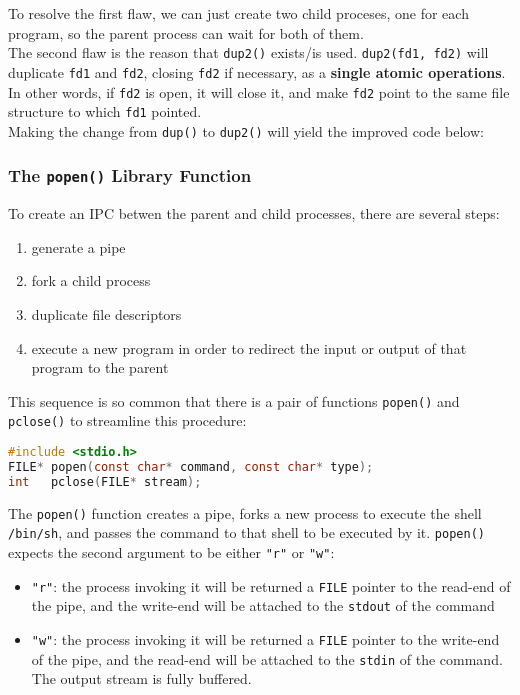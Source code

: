 \documentclass{article}
\newcommand{\bold}[1]{\textbf{#1}}
\renewcommand{\b}{\item[$\circ$]}
\newcommand{\newlist}{\begin{itemize}}
\renewcommand{\endlist}{\end{itemize}}
\newcommand{\code}[1]{\texttt{#1}}
\begin{document}
\noindent To resolve the first flaw, we can just create two child proceses, one for each program, so the parent process can wait for both of them. \\ 

\noindent The second flaw is the reason that \code{dup2()} exists/is used. \code{dup2(fd1, fd2)} will duplicate \code{fd1} and \code{fd2}, closing \code{fd2} if necessary, as a \bold{single atomic operations}. In other words, if \code{fd2} is open, it will close it, and make \code{fd2} point to the same file structure to which \code{fd1} pointed. \\ 

\noindent Making the change from \code{dup()} to \code{dup2()} will yield the improved code below:



\subsubsection{The \code{popen()} Library Function}

To create an IPC betwen the parent and child processes, there are several steps:

\begin{enumerate}
    \item generate a pipe
    \item fork a child process
    \item duplicate file descriptors
    \item execute a new program in order to redirect the input or output of that program to the parent
\end{enumerate}

\noindent This sequence is so common that there is a pair of functions \code{popen()} and \code{pclose()} to streamline this procedure:

\begin{lstlisting}[language=C]
#include <stdio.h>
FILE* popen(const char* command, const char* type);
int   pclose(FILE* stream);
\end{lstlisting}

\noindent The \code{popen()} function creates a pipe, forks a new process to execute the shell \code{/bin/sh}, and passes the command to that shell to be executed by it. \code{popen()} expects the second argument to be either \code{"r"} or \code{"w"}:

\newlist 
\b \code{"r"}: the process invoking it will be returned a \code{FILE} pointer to the read-end of the pipe, and the write-end will be attached to the \code{stdout} of the command
\b \code{"w"}: the process invoking it will be returned a \code{FILE} pointer to the write-end of the pipe, and the read-end will be attached to the \code{stdin} of the command. The output stream is fully buffered. 
\endlist
\end{document}

